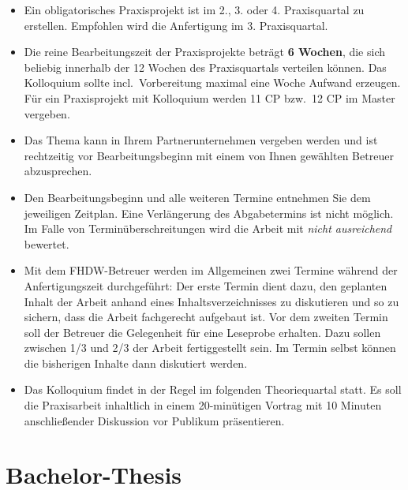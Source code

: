 \begin{itemize}
    \item Ein obligatorisches Praxisprojekt ist im 2., 3. oder 4. Praxisquartal zu erstellen. Empfohlen wird die Anfertigung im 3. Praxisquartal.
    \item Die reine Bearbeitungszeit der Praxisprojekte beträgt \textbf{6 Wochen}, die sich beliebig innerhalb der 12 Wochen des Praxisquartals verteilen können. Das Kolloquium sollte incl.\ Vorbereitung maximal eine Woche Aufwand erzeugen. Für ein Praxisprojekt mit Kolloquium werden 11 CP bzw.\ 12 CP im Master vergeben.
    \item Das Thema kann in Ihrem Partnerunternehmen vergeben werden und ist rechtzeitig vor Bearbeitungsbeginn mit einem von Ihnen gewählten Betreuer abzusprechen. 
    \item Den Bearbeitungsbeginn und alle weiteren Termine entnehmen Sie dem jeweiligen Zeitplan. Eine Verlängerung des Abgabetermins ist nicht möglich. Im Falle von Terminüberschreitungen wird die Arbeit mit \textit{nicht ausreichend} bewertet.
    \item Mit dem FHDW-Betreuer werden im Allgemeinen zwei Termine während der Anfertigungszeit durchgeführt: Der erste Termin dient dazu, den geplanten Inhalt der Arbeit anhand eines Inhaltsverzeichnisses zu diskutieren und so zu sichern, dass die Arbeit fachgerecht aufgebaut ist. Vor dem zweiten Termin soll der Betreuer die Gelegenheit für eine Leseprobe erhalten. Dazu sollen zwischen 1/3 und 2/3 der Arbeit fertiggestellt sein. Im Termin selbst können die bisherigen Inhalte dann diskutiert werden. 
    \item Das Kolloquium findet in der Regel im folgenden Theoriequartal statt. Es soll die Praxisarbeit inhaltlich in einem 20-minütigen Vortrag mit 10 Minuten anschließender Diskussion vor Publikum präsentieren. 
\end{itemize}

\section{Bachelor-Thesis}

